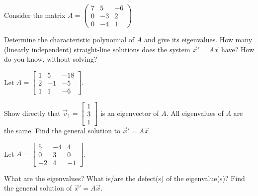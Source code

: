 \begin{exercise}
Consider the matrix
$A=\displaystyle \begin{pmatrix} 
7 & 5 & -6 \\
0 & -3 & 2 \\
0  & -4 & 1 \end{pmatrix}$
\begin{tasks}
\task Determine the characteristic polynomial of $A$ and give its eigenvalues.
\task How many (linearly independent) straight-line solutions does the system $\vec{x}'=A\vec{x}$ have? How do you know, without solving? 
\end{tasks}
\end{exercise}

\begin{exercise}
Let $A=\begin{bmatrix} 1&5&-18\\ 2&-1&-5 \\ 1&1&-6 \end{bmatrix}$. 
\begin{tasks}
\task Show directly that $\vec{v}_1=\begin{bmatrix} 1\\3\\1 \end{bmatrix}$ is an eigenvector of $A$.
\task All eigenvalues of $A$ are the same. Find the general solution to $\vec{x}'=A\vec{x}$.
\end{tasks}
\end{exercise}

\begin{samepage}
\begin{exercise}
Let
$A = \left[ \begin{smallmatrix}
5 & -4 & 4 \\
0 & 3 & 0 \\
-2 & 4 & -1
\end{smallmatrix} \right]$.
\begin{tasks}
\task What are the eigenvalues?
\task What is/are the defect(s) of the eigenvalue(s)?
\task Find the general solution of ${\vec{x}}' = A \vec{x}$.
\end{tasks}
\end{exercise}
\end{samepage}


